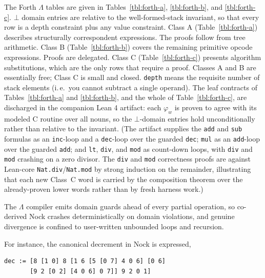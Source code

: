 \documentclass[twoside]{article}
\begin{document}
The Forth $\Lambda$ tables are given in Tables~\ref{tbl:forth-a}, \ref{tbl:forth-b}, and \ref{tbl:forth-c}.  $\bot$ domain entries are relative to the well-formed-stack invariant, so that every row is a depth constraint plus any value constraint.  Class A (Table~\ref{tbl:forth-a}) describes structurally correspondent expressions.  The proofs follow from tree arithmetic.  Class B (Table~\ref{tbl:forth-b}) covers the remaining primitive opcode expressions.  Proofs are delegated.  Class C (Table~\ref{tbl:forth-c}) presents algorithm substitutions, which are the only rows that require a proof.  Classes A and B are essentially free; Class C is small and closed.  \lstinline[style=inlinecode]{depth} means the requisite number of stack elements (i.\,e.\ you cannot subtract a single operand).  The leaf contracts of Tables~\ref{tbl:forth-a} and \ref{tbl:forth-b}, and the whole of Table~\ref{tbl:forth-c}, are discharged in the companion Lean 4 artifact:  each $\varphi_w$ is proven to agree with its modeled C routine over all nouns, so the $\bot$-domain entries hold unconditionally rather than relative to the invariant.  (The artifact supplies the \lstinline[style=inlinecode]{add} and \lstinline[style=inlinecode]{sub} formulas as an \lstinline[style=inlinecode]{inc}-loop and a \lstinline[style=inlinecode]{dec}-loop over the guarded \lstinline[style=inlinecode]{dec}; \lstinline[style=inlinecode]{mul} as an \lstinline[style=inlinecode]{add}-loop over the guarded \lstinline[style=inlinecode]{add}; and \lstinline[style=inlinecode]{lt}, \lstinline[style=inlinecode]{div}, and \lstinline[style=inlinecode]{mod} as count-down loops, with \lstinline[style=inlinecode]{div} and \lstinline[style=inlinecode]{mod} crashing on a zero divisor.  The \lstinline[style=inlinecode]{div} and \lstinline[style=inlinecode]{mod} correctness proofs are against Lean-core \lstinline[style=inlinecode]{Nat.div}/\lstinline[style=inlinecode]{Nat.mod} by strong induction on the remainder, illustrating that each new Class~C word is carried by the composition theorem over the already-proven lower words rather than by fresh harness work.)

The $\Lambda$ compiler emits domain guards ahead of every partial operation, so co-derived Nock crashes deterministically on domain violations, and genuine divergence is confined to user-written unbounded loops and recursion.

For instance, the canonical decrement in Nock is expressed,

\begin{lstlisting}[style=listingblock]
dec := [8 [1 0] 8 [1 6 [5 [0 7] 4 0 6] [0 6]
       [9 2 [0 2] [4 0 6] 0 7]] 9 2 0 1]
\end{lstlisting}
\end{document}
